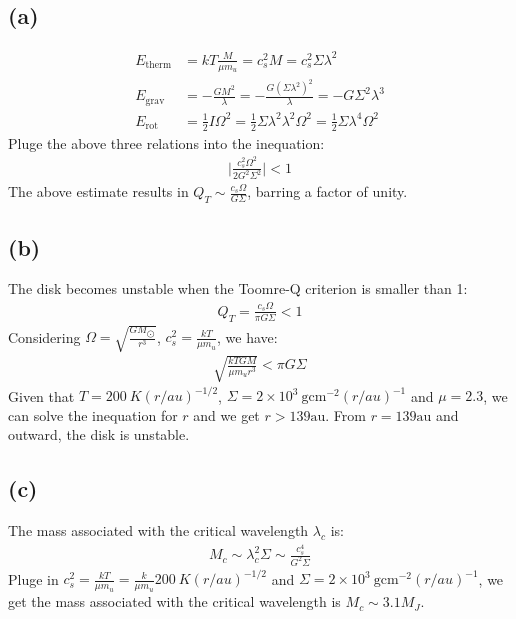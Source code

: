 \documentclass[a4paper,12pt]{article}
\newcommand{\cm}{\mathrm{cm}}
\newcommand{\g}{\mathrm{g}}
\begin{document}
\subsection*{(a)}
\begin{align*}
    E_{\text{therm}} &= kT \frac{M}{\mu m_u} = c_s^2 M = c_s^2 \Sigma \lambda^2 \\
    E_{\text{grav}} &= - \frac{G M^2}{\lambda} = - \frac{G (\Sigma \lambda^2)^2}{\lambda} = -G\Sigma^2 \lambda^3 \\
    E_{\text{rot}} &= \frac{1}{2} I \Omega^2 = \frac{1}{2} \Sigma \lambda^2 \lambda^2 \Omega^2 = \frac{1}{2} \Sigma \lambda^4 \Omega^2
\end{align*}
Pluge the above three relations into the inequation:
\begin{align*}
    \vert \frac{c_s^2 \Omega^2}{2 G^2 \Sigma^2} \vert < 1
\end{align*}
The above estimate results in $Q_T \sim \frac{c_s \Omega}{G \Sigma}$, barring a factor of unity.
\subsection*{(b)}
The disk becomes unstable when the Toomre-Q criterion is smaller than 1:
\begin{align*}
    Q_T = \frac{c_s \Omega}{\pi G \Sigma} < 1
\end{align*}
Considering $\Omega = \sqrt{\frac{GM_{\bigodot}}{r^3}}$, $c_s^2 = \frac{kT}{\mu m_u}$, 
we have:
\begin{align*}
    \sqrt{\frac{kT GM}{\mu m_u r^3}} < \pi G \Sigma
\end{align*}
Given that $T = 200 \ K (r/au)^{-1/2}$, $\Sigma = 2\times 10^3 \ \g \cm^{-2} (r/au)^{-1}$ and $\mu=2.3$, 
we can solve the inequation for $r$ and we get $r>139 \text{au}$. From $r=139 \text{au}$ and outward,
the disk is unstable.

\subsection*{(c)}
The mass associated with the critical wavelength $\lambda_c$ is:
\begin{align*}
    M_c \sim \lambda_c^2 \Sigma \sim \frac{c_s^4}{G^2\Sigma}
\end{align*}
Pluge in $c_s^2 = \frac{kT}{\mu m_u} = \frac{k}{\mu m_u} 200 \ K (r/au)^{-1/2}$ and $\Sigma = 2\times 10^3 \ \g \cm^{-2} (r/au)^{-1}$, 
we get the mass associated with the critical wavelength is $M_c \sim 3.1 M_J$.
\end{document}
